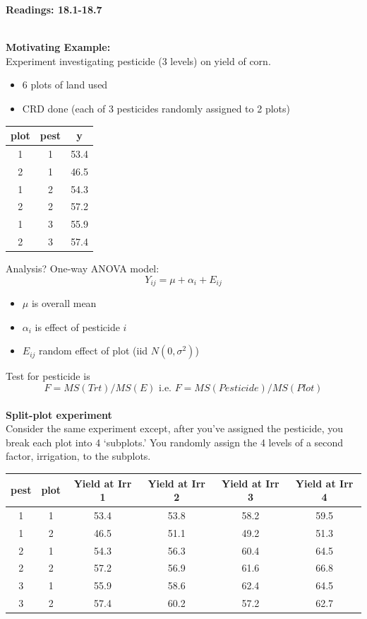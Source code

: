 \begin{center}\large\textbf{Readings: 18.1-18.7}\\
\normalsize \end{center}
\large ~\hrulefill
~\\

\textbf{Motivating Example:}\\
Experiment investigating pesticide (3 levels) on yield of corn.  
\begin{itemize}
\item 6 plots of land used
\item CRD done (each of 3 pesticides randomly assigned to 2 plots)
\end{itemize}

\begin{center}
\begin{tabular}{ccc}
plot &    pest &     y\\\hline
1&        1 &    53.4\\
2&        1 &    46.5\\
1&        2 &    54.3\\
2 &       2 &    57.2\\
1 &       3 &    55.9\\
2  &      3 &    57.4\\
\end{tabular}
\end{center}

Analysis?  One-way ANOVA model:
$$Y_{ij}=\mu+\alpha_{i}+E_{ij}$$
\begin{itemize}
\item $\mu$ is overall mean
\item $\alpha_i$ is effect of pesticide $i$
\item $E_{ij}$ random effect of plot (iid $N(0,\sigma^2)$)
\end{itemize}
Test for pesticide is
$$F=MS(Trt)/MS(E)\mbox{  i.e.  }F=MS(Pesticide)/MS(Plot)$$~\\

\textbf{Split-plot experiment}\\
Consider the same experiment except, after you've assigned the pesticide, you break each plot into 4 `subplots.'  You randomly assign the 4 levels of a second factor, irrigation, to the subplots.\\
\begin{center}
\begin{tabular}{cccccc}
pest &   plot &    Yield at Irr 1 &    Yield at Irr 2 &     Yield at Irr 3 &     Yield at Irr 4\\\hline
1 &      1   &     53.4 &   53.8 &   58.2  &  59.5\\
1 &      2  &      46.5 &   51.1 &   49.2  &  51.3\\
2 &      1  &      54.3 &   56.3 &   60.4  &  64.5\\
2 &      2  &      57.2 &   56.9 &   61.6  &  66.8\\
3 &      1  &      55.9 &   58.6 &   62.4  &  64.5\\
3 &      2  &      57.4  &  60.2 &   57.2  &  62.7\\
\end{tabular}
\end{center}

